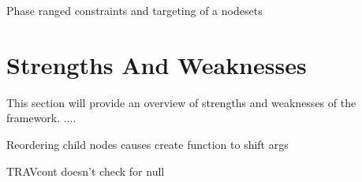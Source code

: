 \documentclass[twoside,openright]{uva-bachelor-thesis}
\newcommand{\code}[1]{\texttt{\footnotesize#1}}
\begin{document}
			\begin{codebox}[label=c-targets]{Phase ranged constraints and targeting of a nodesets}
			\end{codebox}
		
	
	\section{Strengths And Weaknesses}
		This section will provide an overview of strengths and weaknesses of the framework. 
		....
		
		Reordering child nodes causes create function to shift args
		
		TRAVcont doesn't check for null
	
		
		

\end{document}
